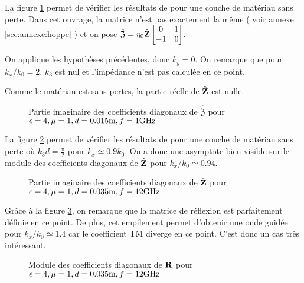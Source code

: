         La figure \ref{fig:imp_fourier:plan:hoppe} permet de vérifier les résultats de \cite[p.~33]{hoppe_impedance_1995} pour une couche de matériau sans perte. Dans cet ouvrage, la matrice n’est pas exactement la même ( voir annexe \ref{sec:annexe:hoppe} ) et on pose \(\hat{\mathfrak{Z}} = \eta_0\hat{\mathbf{Z}}\begin{bmatrix}0&1\\-1&0\end{bmatrix}\).

        On applique les hypothèses précédentes, donc \(k_y=0\). On remarque que pour \(k_x\slash k_0=2\), \(k_3\) est nul et l'impédance n'est pas calculée en ce point. 

        Comme le matériau est sans pertes, la partie réelle de \(\hat{\mathbf{Z}}\) est nulle. 

        \begin{figure}[!hbt]
            \centering
            
            \caption[Reproduction résultat Hoppe & Rahmat-Samii p.~33]{Partie imaginaire des coefficients diagonaux de \(\hat{\mathfrak Z}\) pour \(\epsilon = 4, \mu = 1, d=0.015\text{m}, f=1\text{GHz}\)}
            \label{fig:imp_fourier:plan:hoppe}
        \end{figure}

        La figure \ref{fig:imp_fourier:plan:soudais} permet de vérifier les résultats de \cite{soudais_3d_2017} pour une couche de matériau sans perte où \(k_3d = \frac{\pi}{2}\) pour \(k_x \simeq 0.9 k_0\). On a donc une asymptote bien visible sur le module des coefficients diagonaux de \(\hat{\mathbf{Z}}\) pour \(k_x\slash k_0 \simeq 0.94\).

        \begin{figure}[!hbt]
            \centering
            
            \caption[Reproduction résultat P. Soudais p.~11]{Partie imaginaire des coefficients diagonaux de \(\hat{\mathbf{Z}}\) pour \(\epsilon = 4, \mu = 1, d=0.035\text{m}, f=12\text{GHz}\)}
            \label{fig:imp_fourier:plan:soudais}
        \end{figure}


        Grâce à la figure \ref{fig:reflex_fourier:plan:soudais}, on remarque que la matrice de réflexion est parfaitement définie en ce point. De plus, cet empilement permet d'obtenir une onde guidée pour \(k_x\slash k_0 \simeq 1.4\) car le coefficient TM diverge en ce point. C'est donc un cas très intéressant.

        \begin{figure}[!hbt]
            \centering
            
            \caption[Reproduction résultat P. Soudais p.~11]{Module des coefficients diagonaux de \(\mathbf{R}\) pour \(\epsilon = 4, \mu = 1, d=0.035\text{m}, f=12\text{GHz}\)}
            \label{fig:reflex_fourier:plan:soudais}
        \end{figure}


